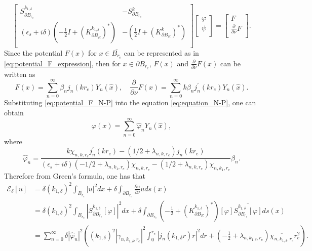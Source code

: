 \documentclass[11pt,reqno,twoside]{amsart}
\theoremstyle{definition}
\theoremstyle{remark}
\numberwithin{equation}{section}
\begin{document}
\begin{equation}\label{eq:equation_N-P}
  \left[
    \begin{array}{cc}
      S_{\partial B_{r_e}}^{k_{1,\delta}} & -S_{\partial B_{r_e}}^{k} \\
      \left(\epsilon_s+i\delta\right)\left(-\frac{1}{2}I + \left(K_{\partial B_R}^{k_{1,\delta}}\right)^*\right) & -\left(\frac{1}{2}I+ \left(K_{\partial B_R}^{k}\right)^*\right) \\
    \end{array}
  \right]
\left[
  \begin{array}{c}
    \varphi \\
    \psi \\
  \end{array}
\right]=
\left[
  \begin{array}{c}
    F \\
    \frac{\partial}{\partial{\nu}}F \\
  \end{array}
\right].
\end{equation}
Since the potential $F(x)$ for $x\in\overline{B_{r_e}}$ can be represented as in \eqref{eq:potential_F_expression}, then for $x\in\partial B_{r_e}$, $F(x)$ and $\frac{\partial}{\partial\nu}F(x)$ can be written as
\begin{equation}\label{eq:potential_F_N-P}
 F(x)=\sum_{n=0}^{\infty} \beta_n j_n(kr_e)Y_n(\hat{x}), \quad \frac{\partial}{\partial\nu}F(x)=\sum_{n=0}^{\infty} k\beta_n j_n^{\prime}(kr_e)Y_n(\hat{x}).
\end{equation}
Substituting \eqref{eq:potential_F_N-P} into the equation \eqref{eq:equation_N-P}, one can obtain
\begin{equation}
  \varphi(x)=\sum_{n=0}^{\infty}\hat{\varphi}_n Y_n(\hat{x}),
\end{equation}
where
\begin{equation}\label{eq:expression_varphi_n}
  \hat{\varphi}_n=\frac{k\chi_{n,k,r_e}j_n^{\prime}(kr_e)-(1/2+\lambda_{n,k,r_e})j_n(kr_e)} {(\epsilon_s+i\delta)(-1/2+\lambda_{n,k_1,r_e})\chi_{n,k,r_e}-(1/2+\lambda_{n,k,r_e})\chi_{n,k_1,r_e}}\beta_n.
\end{equation}
Therefore from Green's formula, one has that
\begin{equation*}
  \begin{split}
    \mathscr{E}_{\delta}[u] & = \delta(k_{1,\delta})^2\int_{B_{r_e}}|u|^2 dx + \delta\int_{\partial B_{r_e}}\frac{\partial u}{\partial\nu}\overline{u} ds(x)\\
      & = \delta(k_{1,\delta})^2\int_{B_{r_e}}|S_{\partial B_{r_e}}^{k_{1,\delta}}[\varphi]|^2 dx + \delta\int_{\partial B_{r_e}}\left(-\frac{1}{2} + \left(K_{\partial B_R}^{k_{1,\delta}}\right)^* \right)[\varphi]\overline{S_{\partial B_{r_e}}^{k_{1,\delta}}[\varphi]} ds(x) \\
      & =\sum_{n=0}^{\infty}\delta |\hat{\varphi}_n|^2 \left((k_{1,\delta})^2 |\gamma_{n,k_{1,\delta},r_e}|^2\int_{0}^{r_e}|j_n(k_{1,\delta}r)r|^2dr +(-\frac{1}{2}+\lambda_{n,k_{1,\delta},r_e})\overline{\chi_{n,k_{1,\delta},r_e}}r_e^2   \right).
  \end{split}
\end{equation*}
\end{document}

